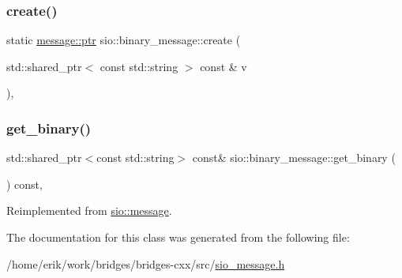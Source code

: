 \subsubsection{\texorpdfstring{create()}{create()}}
{\footnotesize\ttfamily static \hyperlink{classsio_1_1message_a6340b6fef57e4516eb17928b1885a615}{message\+::ptr} sio\+::binary\+\_\+message\+::create (\begin{DoxyParamCaption}\item[{std\+::shared\+\_\+ptr$<$ const std\+::string $>$ const \&}]{v }\end{DoxyParamCaption})\hspace{0.3cm}{\ttfamily [inline]}, {\ttfamily [static]}}

\mbox{\label{classsio_1_1binary__message_aac4db910fd9afb507ef0750394c5cd29}} 
\subsubsection{\texorpdfstring{get\+\_\+binary()}{get\_binary()}}
{\footnotesize\ttfamily std\+::shared\+\_\+ptr$<$const std\+::string$>$ const\& sio\+::binary\+\_\+message\+::get\+\_\+binary (\begin{DoxyParamCaption}{ }\end{DoxyParamCaption}) const\hspace{0.3cm}{\ttfamily [inline]}, {\ttfamily [virtual]}}



Reimplemented from \hyperlink{classsio_1_1message_a55b9eeeb305f46bbf21ae339501174c2}{sio\+::message}.



The documentation for this class was generated from the following file\+:\begin{DoxyCompactItemize}
\item 
/home/erik/work/bridges/bridges-\/cxx/src/\hyperlink{sio__message_8h}{sio\+\_\+message.\+h}\end{DoxyCompactItemize}
